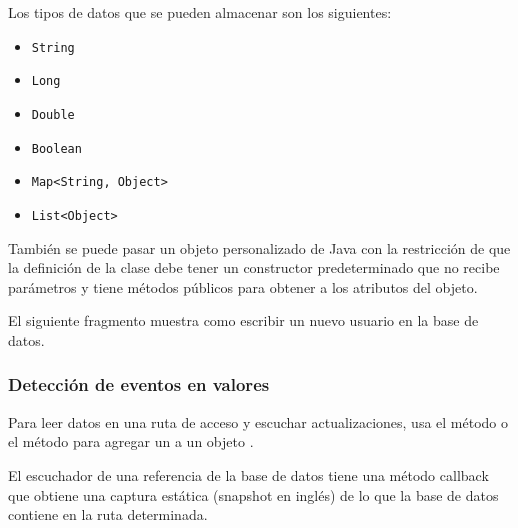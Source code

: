 Los tipos de datos que se pueden almacenar son los siguientes:
\begin{itemize}
\item {}
\texttt{String}

\item {}
\texttt{Long}

\item {}
\texttt{Double}

\item {}
\texttt{Boolean}

\item {}
\texttt{Map\textless{}String, Object\textgreater{}}

\item {}
\texttt{List\textless{}Object\textgreater{}}

\end{itemize}

También se puede pasar un objeto personalizado de Java con la restricción
de que la definición de la clase debe tener un constructor predeterminado
que no recibe parámetros y tiene métodos públicos para obtener a los atributos
del objeto.

El siguiente fragmento muestra como escribir un nuevo usuario en la base de
datos.

%
\begin{sphinxVerbatim}[commandchars=\\\{\}]
      
    
\end{sphinxVerbatim}


\subsubsection{Detección de eventos en valores}
\label{\detokenize{dev_docs:detecteccion-eventos-de-valores}}
Para leer datos en una ruta de acceso y escuchar actualizaciones, usa el
método  o el método 
para agregar un  a un objeto .

El escuchador  de una referencia de la base de datos
tiene una método callback  que obtiene una captura estática (snapshot en inglés)
de lo que la base de datos contiene en la ruta determinada.

